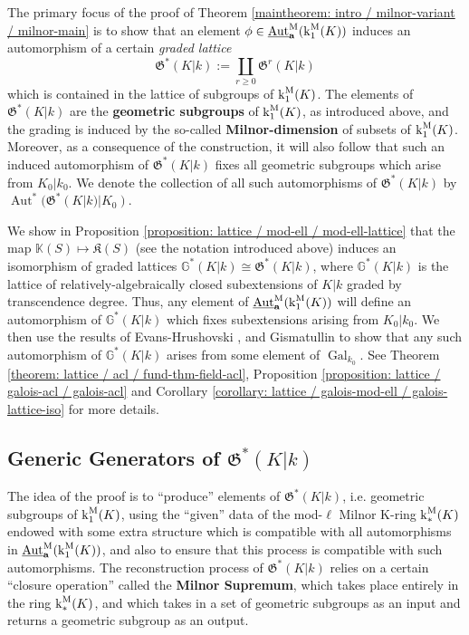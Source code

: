 \documentclass[11pt]{amsart}
\theoremstyle{definition}
\theoremstyle{remark}
\numberwithin{equation}{section}
\DeclareMathOperator{\Aut}{Aut}
\DeclareMathOperator{\Gal}{Gal}
\newcommand{\Gbb}{\mathbb{G}}
\newcommand{\Kbb}{\mathbb{K}}
\newcommand{\abf}{\mathbf{a}}
\newcommand{\Kfrak}{\mathfrak{K}}
\newcommand{\Gfrak}{\mathfrak{G}}
\newcommand{\UAutm}{\underline{\Aut}^{\rm M}}
\renewcommand{\k}{\operatorname{k}^{\rm M}}
\newcommand{\Galk}{{\Gal_{k_0}}}
\begin{document}
The primary focus of the proof of Theorem \ref{maintheorem: intro / milnor-variant / milnor-main} is to show that an element $\phi \in \UAutm_\abf(\k_1(K))$ induces an automorphism of a certain \emph{graded lattice}
\[ \Gfrak^*(K|k) := \coprod_{r \geq 0} \Gfrak^r(K|k) \]
which is contained in the lattice of subgroups of $\k_1(K)$.
The elements of $\Gfrak^*(K|k)$ are the {\bf geometric subgroups} of $\k_1(K)$, as introduced above, and the grading is induced by the so-called {\bf Milnor-dimension} of subsets of $\k_1(K)$. 
Moreover, as a consequence of the construction, it will also follow that such an induced automorphism of $\Gfrak^*(K|k)$ fixes all geometric subgroups which arise from $K_0|k_0$.
We denote the collection of all such automorphisms of $\Gfrak^*(K|k)$ by $\Aut^*(\Gfrak^*(K|k)|K_0)$.

We show in Proposition \ref{proposition: lattice / mod-ell / mod-ell-lattice} that the map $\Kbb(S) \mapsto \Kfrak(S)$ (see the notation introduced above) induces an isomorphism of graded lattices $\Gbb^*(K|k) \cong \Gfrak^*(K|k)$, where $\Gbb^*(K|k)$ is the lattice of relatively-algebraically closed subextensions of $K|k$ graded by transcendence degree.
Thus, any element of $\UAutm_\abf(\k_1(K))$ will define an automorphism of $\Gbb^*(K|k)$ which fixes subextensions arising from $K_0|k_0$.
We then use the results of {\sc Evans-Hrushovski} \cite{Evans:1991}, \cite{Evans:1995} and {\sc Gismatullin} \cite{Gismatullin:2008} to show that any such automorphism of $\Gbb^*(K|k)$ arises from some element of $\Galk$.
See Theorem \ref{theorem: lattice / acl / fund-thm-field-acl}, Proposition \ref{proposition: lattice / galois-acl / galois-acl} and Corollary \ref{corollary: lattice / galois-mod-ell / galois-lattice-iso} for more details.

\subsection{Generic Generators of $\Gfrak^*(K|k)$}

The idea of the proof is to ``produce'' elements of $\Gfrak^*(K|k)$, i.e. geometric subgroups of $\k_1(K)$, using the ``given'' data of the mod-$\ell$ Milnor K-ring $\k_*(K)$ endowed with some extra structure which is compatible with all automorphisms in $\UAutm_\abf(\k_1(K))$, and also to ensure that this process is compatible with such automorphisms.
The reconstruction process of $\Gfrak^*(K|k)$ relies on a certain ``closure operation'' called the {\bf Milnor Supremum}, which takes place entirely in the ring $\k_*(K)$, and which takes in a set of geometric subgroups as an input and returns a geometric subgroup as an output.
\end{document}
